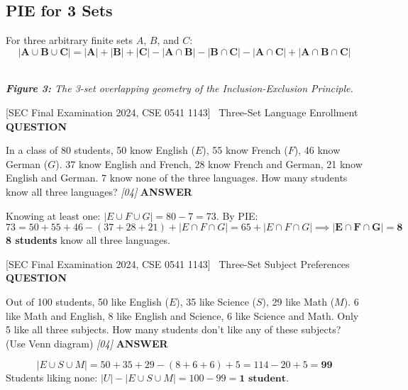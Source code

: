 \documentclass[11pt,a4paper]{article}
\newcommand{\Qlabel}{\textbf{\color{navy}\footnotesize\MakeUppercase{Question}}\par\smallskip}
\newcommand{\Alabel}{\textbf{\color{teal}\footnotesize\MakeUppercase{Answer}}\par\smallskip}
\begin{document}
\newpage
\subsection{PIE for 3 Sets}
For three arbitrary finite sets $A$, $B$, and $C$:
\[
\mathbf{|A \cup B \cup C| = |A| + |B| + |C| - |A \cap B| - |B \cap C| - |A \cap C| + |A \cap B \cap C|}
\]

\begin{center}
\\[3pt]
{\small\textit{\color{navy}\textbf{Figure 3:} The 3-set overlapping geometry of the Inclusion-Exclusion Principle.}}
\end{center}

\begin{exambox}{[SEC Final Examination 2024, CSE 0541 1143] \ Three-Set Language Enrollment}
\Qlabel
In a class of 80 students, 50 know English ($E$), 55 know French ($F$), 46 know German ($G$). 37 know English and French, 28 know French and German, 21 know English and German. 7 know none of the three languages. How many students know all three languages? \hfill\textit{[04]}
\tcblower
\Alabel
Knowing at least one: $|E\cup F\cup G| = 80-7 = 73$. By PIE:
\[
73 = 50+55+46-(37+28+21)+|E\cap F\cap G| = 65 + |E\cap F\cap G| \implies \mathbf{|E\cap F\cap G| = 8}
\]
\textbf{8 students} know all three languages.
\end{exambox}

\begin{exambox}{[SEC Final Examination 2024, CSE 0541 1143] \ Three-Set Subject Preferences}
\Qlabel
Out of 100 students, 50 like English ($E$), 35 like Science ($S$), 29 like Math ($M$). 6 like Math and English, 8 like English and Science, 6 like Science and Math. Only 5 like all three subjects. How many students don't like any of these subjects? (Use Venn diagram) \hfill\textit{[04]}
\tcblower
\Alabel
\[
|E \cup S \cup M| = 50+35+29-(8+6+6)+5 = 114-20+5 = \mathbf{99}
\]
Students liking none: $|U|-|E\cup S\cup M| = 100-99 = \mathbf{1 \text{ student}}$.
\end{exambox}
\end{document}
